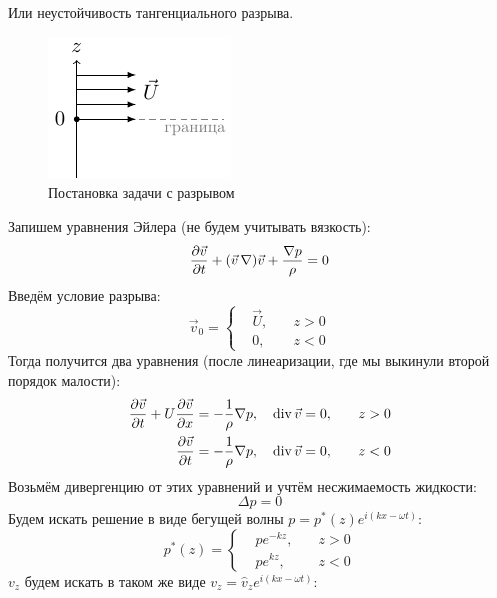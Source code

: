 Или неустойчивость тангенциального разрыва.
\begin{figure}[H]
    \centering
    \includegraphics[scale=1.5]{img/kelvin}
    \caption{Постановка задачи с разрывом}
    \label{fig:kelv-gelm}
\end{figure}
Запишем уравнения Эйлера (не будем учитывать вязкость):
\begin{equation}
    \pdv{\vec{v}}{t}+ (\vec{v}\,\nabla) \vec{v} + 
        \frac{\nabla p}{\rho}=0
\end{equation}
Введём условие разрыва:
\begin{equation}
    \vec{v}_0 = \left\{
    \begin{aligned}
        &\vec{U}, \quad &z>0 \\
        &0, \quad &z<0
    \end{aligned}\right.
\end{equation}
Тогда получится два уравнения (после линеаризации, 
где мы выкинули второй порядок малости):
\begin{gather}
    \begin{aligned}
     \pdv{\vec{v}}{t}+U\pdv{\vec{v}}{x} = -\frac{1}{\rho}\nabla p, 
     &\quad \operatorname{div} \vec{v} = 0, &\quad z>0\\
    \pdv{\vec{v}}{t} = -\frac{1}{\rho}\nabla p, 
                             &\quad \operatorname{div} \vec{v} = 0, &\quad z<0\\
    \end{aligned}
\end{gather}
Возьмём дивергенцию от этих уравнений и учтём несжимаемость жидкости:
\begin{equation}
    \Delta p = 0
\end{equation}
Будем искать решение в виде бегущей волны $p=p^*(z)e^{i(kx-\omega t)}$:
\begin{equation}
    p^*(z) = \left\{
    \begin{aligned}
        &p e^{-kz}, \quad &z>0\\        
        &p e^{kz}, \quad & z<0
    \end{aligned}
    \right.
\end{equation}
$v_z$ будем искать в таком же виде $v_z=\hat{v}_z e^{i(kx-\omega t)}$:
